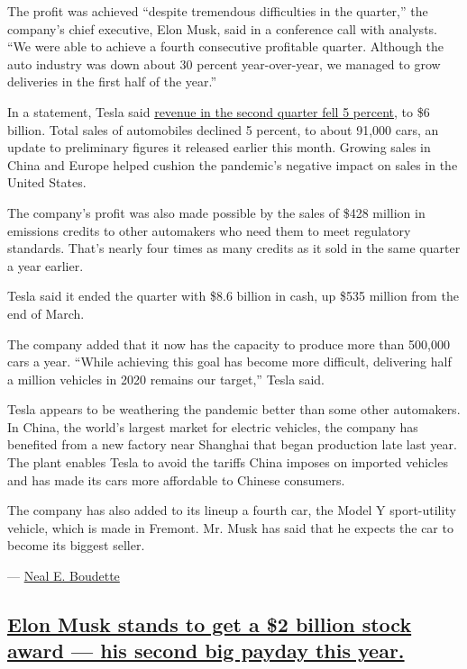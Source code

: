The profit was achieved ``despite tremendous difficulties in the
quarter,'' the company's chief executive, Elon Musk, said in a
conference call with analysts. ``We were able to achieve a fourth
consecutive profitable quarter. Although the auto industry was down
about 30 percent year-over-year, we managed to grow deliveries in the
first half of the year.''

In a statement, Tesla said
\href{https://ir.tesla.com/static-files/f41f4254-f1cc-4929-a0b6-6623b00475a6}{revenue
in the second quarter fell 5 percent}, to \$6 billion. Total sales of
automobiles declined 5 percent, to about 91,000 cars, an update to
preliminary figures it released earlier this month. Growing sales in
China and Europe helped cushion the pandemic's negative impact on sales
in the United States.

The company's profit was also made possible by the sales of \$428
million in emissions credits to other automakers who need them to meet
regulatory standards. That's nearly four times as many credits as it
sold in the same quarter a year earlier.

Tesla said it ended the quarter with \$8.6 billion in cash, up \$535
million from the end of March.

The company added that it now has the capacity to produce more than
500,000 cars a year. ``While achieving this goal has become more
difficult, delivering half a million vehicles in 2020 remains our
target,'' Tesla said.

Tesla appears to be weathering the pandemic better than some other
automakers. In China, the world's largest market for electric vehicles,
the company has benefited from a new factory near Shanghai that began
production late last year. The plant enables Tesla to avoid the tariffs
China imposes on imported vehicles and has made its cars more affordable
to Chinese consumers.

The company has also added to its lineup a fourth car, the Model Y
sport-utility vehicle, which is made in Fremont. Mr. Musk has said that
he expects the car to become its biggest seller.

--- \href{https://www.nytimes.com/by/neal-e-boudette}{Neal E. Boudette}

\hypertarget{elon-musk-stands-to-get-a-2-billion-stock-award--his-second-big-payday-this-year}{%
\subsection{\texorpdfstring{\protect\hyperlink{elon-musk-salary}{Elon
Musk stands to get a \$2 billion stock award --- his second big payday
this
year.}}{Elon Musk stands to get a \$2 billion stock award --- his second big payday this year.}}\label{elon-musk-stands-to-get-a-2-billion-stock-award--his-second-big-payday-this-year}}


